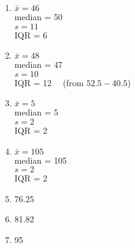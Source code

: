 \documentclass[12pt,letterpaper]{article}
\begin{document}
\newpage
\begin{multicols}{2}
\begin{enumerate}
\item $\bar{x} = 46$\\
median = 50\\
$s=11$\\
IQR = 6
\item $\bar{x} = 48$\\
median = 47\\
$s=10$\\
IQR = 12~~ (from $52.5-40.5$)
\item $\bar{x} = 5$\\
median = 5\\
$s=2$\\
IQR = 2
\columnbreak
\item $\bar{x} = 105$\\
median = 105\\
$s=2$\\
IQR = 2
\item 76.25
\item 81.82
\item 95
\end{enumerate}
\end{multicols}
\end{document}
